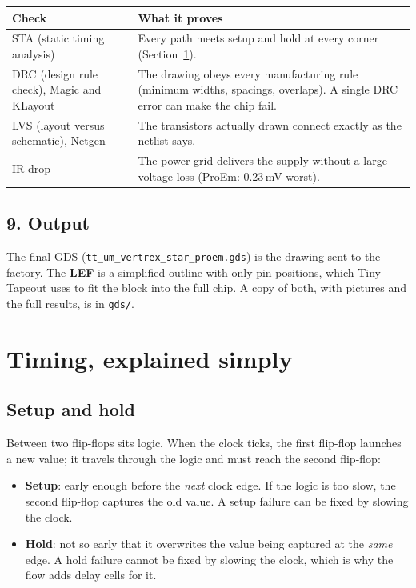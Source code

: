 \documentclass[11pt,a4paper]{article}
\newcommand{\file}[1]{\texttt{#1}}
\begin{document}
\begin{center}
\begin{tabularx}{\linewidth}{@{}lL@{}}
\toprule
Check & What it proves \\
\midrule
STA (static timing analysis) & Every path meets setup and hold at every corner (Section~\ref{sec:timing}). \\
DRC (design rule check), Magic and KLayout & The drawing obeys every manufacturing rule (minimum widths, spacings, overlaps). A single DRC error can make the chip fail. \\
LVS (layout versus schematic), Netgen & The transistors actually drawn connect exactly as the netlist says. \\
IR drop & The power grid delivers the supply without a large voltage loss (ProEm: 0.23\,mV worst). \\
\bottomrule
\end{tabularx}
\end{center}

\subsection{9. Output}

The final GDS (\file{tt\_um\_vertrex\_star\_proem.gds}) is the drawing sent to the factory. The \textbf{LEF} is a simplified outline with only pin positions, which Tiny Tapeout uses to fit the block into the full chip. A copy of both, with pictures and the full results, is in \file{gds/}.

\section{Timing, explained simply}\label{sec:timing}

\subsection{Setup and hold}

Between two flip-flops sits logic. When the clock ticks, the first flip-flop launches a new value; it travels through the logic and must reach the second flip-flop:
\begin{itemize}
\item \textbf{Setup}: early enough before the \emph{next} clock edge. If the logic is too slow, the second flip-flop captures the old value. A setup failure can be fixed by slowing the clock.
\item \textbf{Hold}: not so early that it overwrites the value being captured at the \emph{same} edge. A hold failure cannot be fixed by slowing the clock, which is why the flow adds delay cells for it.
\end{itemize}
\end{document}
